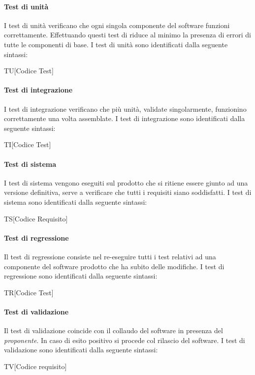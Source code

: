 \paragraph{Test di unità}
I test di unità verificano che ogni singola componente del software funzioni 
correttamente. Effettuando questi test di riduce al minimo la presenza di errori 
di tutte le componenti di base. I test di unità sono identificati dalla seguente 
sintassi:
\begin{center}
  TU[Codice Test]
\end{center}
\paragraph{Test di integrazione}
I test di integrazione verificano che più unità, validate singolarmente, funzionino 
correttamente una volta assemblate. I test di integrazione sono identificati 
dalla seguente sintassi:
\begin{center}
  TI[Codice Test]
\end{center}
\paragraph{Test di sistema}
I test di sistema vengono eseguiti sul prodotto che si ritiene essere giunto ad 
una versione definitiva, serve a verificare che tutti i requisiti siano 
soddisfatti. I test di sistema sono identificati dalla seguente sintassi:
\begin{center}
  TS[Codice Requisito]
\end{center}
\paragraph{Test di regressione}
Il test di regressione consiste nel re-eseguire tutti i test relativi ad una 
componente del software prodotto che ha subito delle modifiche. I test di 
regressione sono identificati dalla seguente sintassi:
\begin{center}
  TR[Codice Test]
\end{center}
\paragraph{Test di validazione}
Il test di validazione coincide con il collaudo del software in presenza del 
\textit{proponente}. In caso di esito positivo si procede col rilascio del 
software. I test di validazione sono identificati dalla seguente sintassi:
\begin{center}
  TV[Codice requisito]
\end{center}

